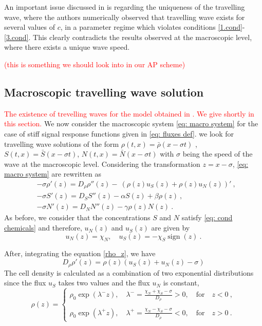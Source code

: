 \documentclass[11pt,twoside]{article}
\DeclareMathOperator{\sign}{sign}
\numberwithin{equation}{section}
\begin{document}
\noindent An important issue discussed in \cite{calvez2018well} is regarding the uniqueness of the travelling wave, where the authors numerically observed that travelling wave exists for several values of $c$, in a parameter regime which violates conditions \eqref{1.cond}-\eqref{3.cond}. This clearly contradicts the results observed at the macroscopic level, where there exists a unique wave speed.  

\textcolor{red}{(this is something we should look into in our AP scheme)}


\subsection{Macroscopic travelling wave solution}
\textcolor{red}{The existence of trevelling waves for the model obtained in \cite{saragosti2010mathematical}. We give shortly in this section.} We now consider the macroscopic system \eqref{eq: macro system} for the case of stiff signal response functions given in \eqref{eq: fluxes def}. we look for travelling wave solutions of the form
$\rho(t,x)=\bar{\rho}(x-\sigma t)$ , $S(t,x)=\bar{S}(x-\sigma t)$, $N(t,x)=\bar{N}(x-\sigma t)$ with $\sigma$  being the speed of the wave at the macroscopic level. Considering the transformation $z=x-\sigma$,  \eqref{eq: macro system} are rewritten as
\begin{align}
&-\sigma \rho'(z) =D_\rho \rho''(z)-\ (\rho(z) u_S(z)+\rho(z) u_N(z))'\ \label{rho_z},\\
&-\sigma S'(z) =D_S S''(z)-\alpha S(z)+\beta \rho(z)\ ,\\
&-\sigma  N'(z)=D_N N''(z)-\gamma \rho(z) N(z)\ .
\end{align}
As before, we consider that the concentrations $S$ and $N$ satisfy \eqref{eq: cond chemicals} and therefore, $u_N(z)$ and $u_S(z)$ are given by
$$ 
u_N(z)=\chi_N ,\quad u_S(z)=-\chi_S \sign(z)\ .
$$

After, integrating the equation \eqref{rho_z}, we have 
\begin{displaymath}
    D_\rho \rho'(z)=\rho(z)(u_S(z)+u_N(z)-\sigma)
\end{displaymath}
The cell density is calculated as a combination of two exponential distributions since the flux $u_S$ takes two values and the flux $u_N$ is constant, 
\begin{equation}\label{lamda}
    \rho(z)= \begin{cases} 
\rho_0\exp(\lambda^{-}z),\quad\lambda^{-}=
\frac{\chi_N+\chi_S-\sigma}{D_{\rho}}>0,\quad \textrm{for}\quad z<0 \ ,\\
\\

    \rho_0\exp(\lambda^{+}z), \quad \lambda^{+}=\frac{\chi_N-\chi_S-\sigma}{D_{\rho}}<0,\quad \textrm{for}\quad z>0\ .     
\end{cases}
\end{equation}
\end{document}
